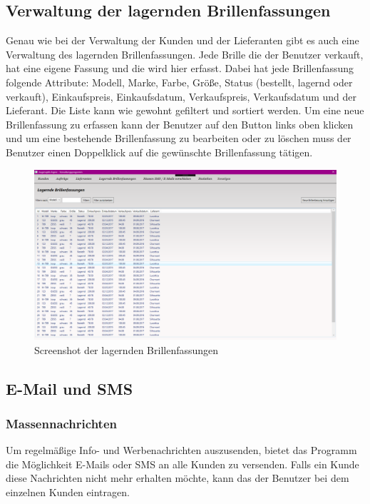 \subsection{Verwaltung der lagernden Brillenfassungen}
Genau wie bei der Verwaltung der Kunden und der Lieferanten gibt es auch eine Verwaltung des lagernden Brillenfassungen. Jede Brille die der Benutzer verkauft, hat eine eigene Fassung und die wird hier erfasst. Dabei hat jede Brillenfassung folgende Attribute: Modell, Marke, Farbe, Größe, Status (bestellt, lagernd oder verkauft), Einkaufspreis, Einkaufsdatum, Verkaufspreis, Verkaufsdatum und der Lieferant. Die Liste kann wie gewohnt gefiltert und sortiert werden. Um eine neue Brillenfassung zu erfassen kann der Benutzer auf den Button links oben klicken und um eine bestehende Brillenfassung zu bearbeiten oder zu löschen muss der Benutzer einen Doppelklick auf die gewünschte Brillenfassung tätigen.
\begin{figure}[H]
\begin{center}
	\includegraphics[scale=.25]{images/Brillenfassungen.png}
\end{center}
	\caption{Screenshot der lagernden Brillenfassungen}
	\label{fig:sample}
\end{figure}
\subsection{E-Mail und SMS}
\subsubsection{Massennachrichten}
Um regelmäßige Info- und Werbenachrichten auszusenden, bietet das Programm die Möglichkeit E-Mails oder SMS an alle Kunden zu versenden. Falls ein Kunde diese Nachrichten nicht mehr erhalten möchte, kann das der Benutzer bei dem einzelnen Kunden eintragen.
